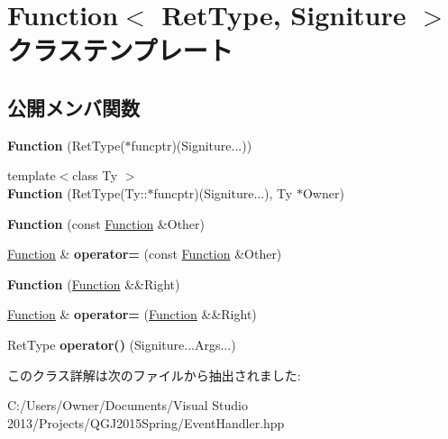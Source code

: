 \hypertarget{class_function}{}\section{Function$<$ Ret\+Type, Signiture $>$ クラステンプレート}
\label{class_function}
\subsection*{公開メンバ関数}
\begin{DoxyCompactItemize}
\item 
{\bfseries Function} (Ret\+Type($\ast$funcptr)(Signiture...))\hypertarget{class_function_a2f19a35cf5283f12aa88a7c4be54a53d}{}\label{class_function_a2f19a35cf5283f12aa88a7c4be54a53d}

\item 
{\footnotesize template$<$class Ty $>$ }\\{\bfseries Function} (Ret\+Type(Ty\+::$\ast$funcptr)(Signiture...), Ty $\ast$Owner)\hypertarget{class_function_a641d5aa0870c905ef3ce0dd2850c12fc}{}\label{class_function_a641d5aa0870c905ef3ce0dd2850c12fc}

\item 
{\bfseries Function} (const \hyperlink{class_function}{Function} \&Other)\hypertarget{class_function_ab1fcad90fe06502ac364d63e8297e970}{}\label{class_function_ab1fcad90fe06502ac364d63e8297e970}

\item 
\hyperlink{class_function}{Function} \& {\bfseries operator=} (const \hyperlink{class_function}{Function} \&Other)\hypertarget{class_function_ac9bda059c5550186d9d92f4199c73350}{}\label{class_function_ac9bda059c5550186d9d92f4199c73350}

\item 
{\bfseries Function} (\hyperlink{class_function}{Function} \&\&Right)\hypertarget{class_function_a34a82b3c963593729b4146d9a1abb2a1}{}\label{class_function_a34a82b3c963593729b4146d9a1abb2a1}

\item 
\hyperlink{class_function}{Function} \& {\bfseries operator=} (\hyperlink{class_function}{Function} \&\&Right)\hypertarget{class_function_ad2118415a68202facf48e27c6c90744f}{}\label{class_function_ad2118415a68202facf48e27c6c90744f}

\item 
Ret\+Type {\bfseries operator()} (Signiture...\+Args...)\hypertarget{class_function_aa2e71a79c13b5487105569d65ef1f190}{}\label{class_function_aa2e71a79c13b5487105569d65ef1f190}

\end{DoxyCompactItemize}


このクラス詳解は次のファイルから抽出されました\+:\begin{DoxyCompactItemize}
\item 
C\+:/\+Users/\+Owner/\+Documents/\+Visual Studio 2013/\+Projects/\+Q\+G\+J2015\+Spring/Event\+Handler.\+hpp\end{DoxyCompactItemize}
